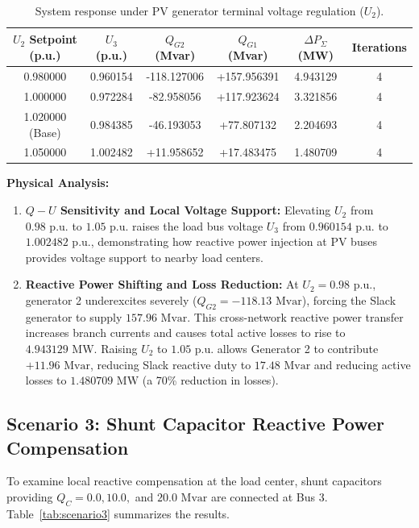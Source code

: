\documentclass[12pt,a4paper,oneside]{report}
\begin{document}
\begin{table}[H]
\centering
\caption{System response under PV generator terminal voltage regulation ($U_2$).}
\label{tab:scenario2}
\begin{tabular}{cccccc}
\toprule
\textbf{$U_2$ Setpoint (p.u.)} & \textbf{$U_3$ (p.u.)} & \textbf{$Q_{G2}$ (Mvar)} & \textbf{$Q_{G1}$ (Mvar)} & \textbf{$\Delta P_{\Sigma}$ (MW)} & \textbf{Iterations} \\
\midrule
0.980000 & 0.960154 & -118.127006 & +157.956391 & 4.943129 & 4 \\
1.000000 & 0.972284 & -82.958056 & +117.923624 & 3.321856 & 4 \\
1.020000 (Base) & 0.984385 & -46.193053 & +77.807132 & 2.204693 & 4 \\
1.050000 & 1.002482 & +11.958652 & +17.483475 & 1.480709 & 4 \\
\bottomrule
\end{tabular}
\end{table}

\textbf{Physical Analysis:}
\begin{enumerate}
    \item \textbf{$Q-U$ Sensitivity and Local Voltage Support:} Elevating $U_2$ from $0.98\text{ p.u.}$ to $1.05\text{ p.u.}$ raises the load bus voltage $U_3$ from $0.960154\text{ p.u.}$ to $1.002482\text{ p.u.}$, demonstrating how reactive power injection at PV buses provides voltage support to nearby load centers.
    \item \textbf{Reactive Power Shifting and Loss Reduction:} At $U_2 = 0.98\text{ p.u.}$, generator 2 underexcites severely ($Q_{G2} = -118.13\text{ Mvar}$), forcing the Slack generator to supply $157.96\text{ Mvar}$. This cross-network reactive power transfer increases branch currents and causes total active losses to rise to $4.943129\text{ MW}$. Raising $U_2$ to $1.05\text{ p.u.}$ allows Generator 2 to contribute $+11.96\text{ Mvar}$, reducing Slack reactive duty to $17.48\text{ Mvar}$ and reducing active losses to $1.480709\text{ MW}$ (a 70\% reduction in losses).
\end{enumerate}

\subsection{Scenario 3: Shunt Capacitor Reactive Power Compensation}
To examine local reactive compensation at the load center, shunt capacitors providing $Q_C = 0.0, 10.0,$ and $20.0\text{ Mvar}$ are connected at Bus 3. Table~\ref{tab:scenario3} summarizes the results.
\end{document}
